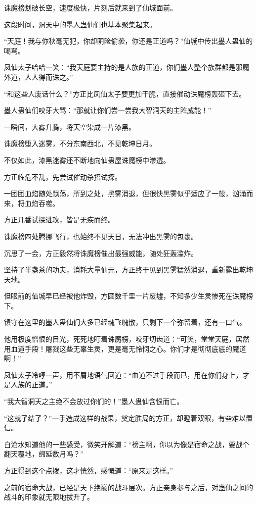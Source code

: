 \begin{this_body}
诛魔榜划破长空，速度极快，片刻后就来到了仙城面前。

这段时间，洞天中的墨人蛊仙们也基本聚集起来。

“天庭！我与你秋毫无犯，你却阴险偷袭，你还是正道吗？”仙城中传出墨人蛊仙的喝骂。

凤仙太子哈哈一笑：“我天庭要主持的是人族的正道，你们墨人整个族群都是邪魔外道，人人得而诛之。”

“和这些人废话什么？”方正比凤仙太子要更加干脆，直接催动诛魔榜轰砸下去。

墨人蛊仙们咬牙大骂：“那就让你们尝一尝我大智洞天的主阵威能！”

一瞬间，大雾升腾，将天空染成一片漆黑。

诛魔榜堕入迷雾，不分东南西北，不见乾坤日月。

不仅如此，漆黑迷雾还不断地向仙蛊屋诛魔榜中渗透。

方正临危不乱，先尝试催动杀招试探。

一团团血焰随处飘荡，所到之处，黑雾消退，但很快黑雾似乎适应了一般，汹涌而来，将血焰吞噬。

方正几番试探进攻，皆是无疾而终。

诛魔榜四处腾挪飞行，也始终不见天日，无法冲出黑雾的包裹。

沉思了一会，方正毅然将诛魔榜催出最强威能，随处狂轰滥炸。

坚持了半盏茶的功夫，消耗大量仙元，方正终于见到黑雾猛然消退，重新露出乾坤天地。

但眼前的仙城早已经被他炸毁，方圆数千里一片废墟，不知多少生灵惨死在诛魔榜下。

镇守在这里的墨人蛊仙们大多已经魂飞魄散，只剩下一个弥留着，还有一口气。

他用极度憎恨的目光，死死地盯着诛魔榜，咬牙切齿道：“可笑，堂堂天庭，居然用血道手段！屠戮这些无辜生灵，更是毫无怜悯之心。你们才是彻彻底底的魔道啊！”

凤仙太子冷哼一声，用不屑地语气回道：“血道不过手段而已，用在你们身上，才是人族的正道。”

“我大智洞天之主绝不会放过你们的！”墨人蛊仙含恨而亡。

“这就了结了？”一手造成这样的战果，奠定胜局的方正，却瞪着双眼，有些难以置信。

白沧水知道他的一些感受，微笑开解道：“榜主啊，你以为像是宿命之战，要战个翻天覆地，绵延数月吗？”

方正得到这个点拨，这才恍然，感慨道：“原来是这样。”

之前的宿命大战，已经是天下绝巅的战斗层次。方正亲身参与之后，对蛊仙之间的战斗的印象就无限地拔升了。


\end{this_body}

